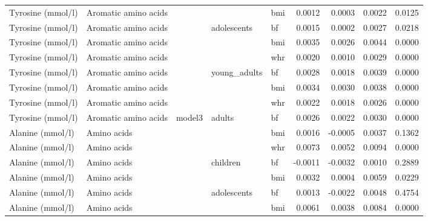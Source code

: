 \documentclass[11pt,twoside]{bristolthesis}
\begin{document}
\begin{longtable}[t]{lllllrrrr}
\cmidrule{1-9}\pagebreak[0]
Tyrosine (mmol/l) & Aromatic amino acids &  &  & bmi & 0.0012 & 0.0003 & 0.0022 & 0.0125\\
\cmidrule{1-2}
\cmidrule{5-9}\nopagebreak
Tyrosine (mmol/l) & Aromatic amino acids &  & \multirow{-2}{*}{\raggedright\arraybackslash adolescents} & bf & 0.0015 & 0.0002 & 0.0027 & 0.0218\\
\cmidrule{1-2}
\cmidrule{4-9}\nopagebreak
Tyrosine (mmol/l) & Aromatic amino acids &  &  & bmi & 0.0035 & 0.0026 & 0.0044 & 0.0000\\
\cmidrule{1-2}
\cmidrule{5-9}\nopagebreak
Tyrosine (mmol/l) & Aromatic amino acids &  &  & whr & 0.0020 & 0.0010 & 0.0029 & 0.0000\\
\cmidrule{1-2}
\cmidrule{5-9}\nopagebreak
Tyrosine (mmol/l) & Aromatic amino acids &  & \multirow{-3}{*}{\raggedright\arraybackslash young\_adults} & bf & 0.0028 & 0.0018 & 0.0039 & 0.0000\\
\cmidrule{1-2}
\cmidrule{4-9}\nopagebreak
Tyrosine (mmol/l) & Aromatic amino acids &  &  & bmi & 0.0034 & 0.0030 & 0.0038 & 0.0000\\
\cmidrule{1-2}
\cmidrule{5-9}\nopagebreak
Tyrosine (mmol/l) & Aromatic amino acids &  &  & whr & 0.0022 & 0.0018 & 0.0026 & 0.0000\\
\cmidrule{1-2}
\cmidrule{5-9}\nopagebreak
Tyrosine (mmol/l) & Aromatic amino acids & \multirow{-8}{*}{\raggedright\arraybackslash model3} & \multirow{-3}{*}{\raggedright\arraybackslash adults} & bf & 0.0026 & 0.0022 & 0.0030 & 0.0000\\
\cmidrule{1-9}\pagebreak[0]
Alanine (mmol/l) & Amino acids &  &  & bmi & 0.0016 & -0.0005 & 0.0037 & 0.1362\\
\cmidrule{1-2}
\cmidrule{5-9}\nopagebreak
Alanine (mmol/l) & Amino acids &  &  & whr & 0.0073 & 0.0052 & 0.0094 & 0.0000\\
\cmidrule{1-2}
\cmidrule{5-9}\nopagebreak
Alanine (mmol/l) & Amino acids &  & \multirow{-3}{*}{\raggedright\arraybackslash children} & bf & -0.0011 & -0.0032 & 0.0010 & 0.2889\\
\cmidrule{1-2}
\cmidrule{4-9}\nopagebreak
Alanine (mmol/l) & Amino acids &  &  & bmi & 0.0032 & 0.0004 & 0.0059 & 0.0229\\
\cmidrule{1-2}
\cmidrule{5-9}\nopagebreak
Alanine (mmol/l) & Amino acids &  & \multirow{-2}{*}{\raggedright\arraybackslash adolescents} & bf & 0.0013 & -0.0022 & 0.0048 & 0.4754\\
\cmidrule{1-2}
\cmidrule{4-9}\nopagebreak
Alanine (mmol/l) & Amino acids &  &  & bmi & 0.0061 & 0.0038 & 0.0084 & 0.0000\\

\end{longtable}
\end{document}
